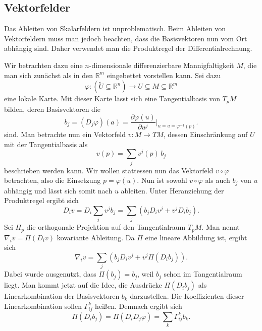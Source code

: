 \documentclass[a4paper,11pt,fleqn,twocolumn,twoside]{scrartcl}
\numberwithin{equation}{section}
\newcommand{\R}{\mathbb R}
\begin{document}
\subsection{Vektorfelder}

Das Ableiten von Skalarfeldern ist unproblematisch. Beim Ableiten von
Vektorfeldern muss man jedoch beachten, dass die Basisvektoren nun
vom Ort abhängig sind. Daher verwendet man die Produktregel der
Differentialrechnung.

Wir betrachten dazu eine $n$-dimensionale differenzierbare
Mannigfaltigkeit $M$, die man sich zunächst als in den $\R^m$ eingebettet
vorstellen kann. Sei dazu
\begin{equation}
\varphi\colon (\tilde U\subseteq \R^n)\to U\subseteq M\subseteq\R^m
\end{equation}
eine lokale Karte. Mit dieser Karte lässt sich eine Tangentialbasis
von $T_p M$ bilden, deren Basisvektoren die%
\begin{equation}
b_j = (D_j\varphi)(a)
= \frac{\partial\varphi(u)}{\partial u^j}\bigg|_{u=a=\varphi^{-1}(p)}.
\end{equation}
sind. Man betrachte nun ein Vektorfeld $v\colon M\to TM$, dessen
Einschränkung auf $U$ mit der Tangentialbasis als
\begin{equation}
v(p) = \sum_{j} v^j(p)\,b_j
\end{equation}
beschrieben werden kann. Wir wollen stattessen nun das Vektorfeld
$v\circ\varphi$ betrachten, also die Einsetzung $p=\varphi(u)$.
Nun ist sowohl $v\circ\varphi$ als auch $b_j$ von $u$ abhängig
und lässt sich somit nach $u$ ableiten. Unter Heranziehung der
Produktregel ergibt sich
\begin{equation}
D_i v = D_i\sum_{j}v^j b_j
= \sum_{j}(b_jD_i v^j+v^jD_i b_j).
\end{equation}
Sei $\Pi_p$ die orthogonale Projektion auf den Tangentialraum
$T_p M$. Man nennt $\nabla_i v = \Pi(D_i v)$ kovariante Ableitung.
Da $\Pi$ eine lineare Abbildung ist, ergibt sich%
\begin{equation}
\nabla_i v = \sum_{j} (b_j D_i v^j+v^j \Pi(D_i b_j)).
\end{equation}
Dabei wurde ausgenutzt, dass $\Pi(b_j)=b_j$, weil $b_j$ schon im
Tangentialraum liegt. Man kommt jetzt auf die Idee, die Ausdrücke
$\Pi(D_i b_j)$ als Linearkombination der Basisvektoren $b_k$
darzustellen. Die Koeffizienten dieser Linearkombination sollen
$\Gamma_{ij}^k$ heißen.
Demnach ergibt sich
\begin{equation}
\Pi(D_i b_j) = \Pi(D_i D_j\varphi) = \sum_k \Gamma_{ij}^k b_k.
\end{equation}
\end{document}
